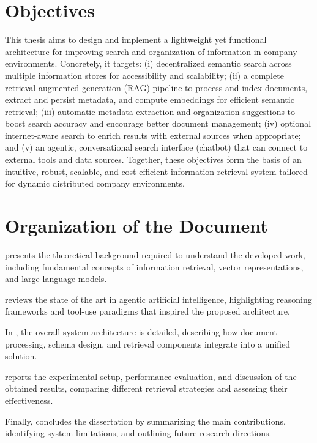 \section{Objectives}
This thesis aims to design and implement a lightweight yet functional architecture for improving search and organization of information in company environments. Concretely, it targets: (i) decentralized semantic search across multiple information stores for accessibility and scalability; (ii) a complete retrieval-augmented generation (\gls{RAG}) pipeline to process and index documents, extract and persist metadata, and compute embeddings for efficient semantic retrieval; (iii) automatic metadata extraction and organization suggestions to boost search accuracy and encourage better document management; (iv) optional internet-aware search to enrich results with external sources when appropriate; and (v) an agentic, conversational search interface (chatbot) that can connect to external tools and data sources. Together, these objectives form the basis of an intuitive, robust, scalable, and cost-efficient information retrieval system tailored for dynamic distributed company environments.
\section{Organization of the Document}

 presents the theoretical background required to understand the developed work, including fundamental concepts of information retrieval, vector representations, and large language models. 

 reviews the state of the art in agentic artificial intelligence, highlighting reasoning frameworks and tool-use paradigms that inspired the proposed architecture. 


In , the overall system architecture is detailed, describing how document processing, schema design, and retrieval components integrate into a unified solution.

 reports the experimental setup, performance evaluation, and discussion of the obtained results, comparing different retrieval strategies and assessing their effectiveness. 

Finally,  concludes the dissertation by summarizing the main contributions, identifying system limitations, and outlining future research directions.
